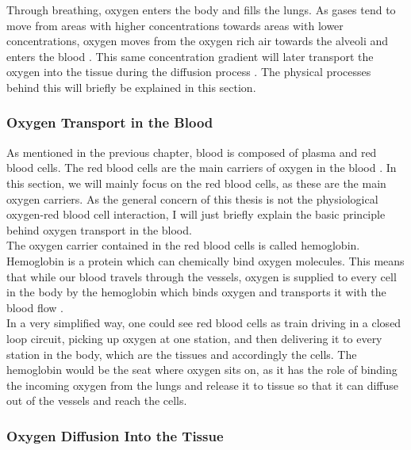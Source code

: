 Through breathing, oxygen enters the body and fills the lungs. As gases tend to move from areas with higher concentrations towards areas with lower concentrations, oxygen moves from the oxygen rich air towards the alveoli and enters the blood \cite{bukwirwa}. This same concentration gradient will later transport the oxygen into the tissue during the diffusion process \cite{pittman2011regulation}. The physical processes behind this will briefly be explained in this section.

\subsubsection*{Oxygen Transport in the Blood}

As mentioned in the previous chapter, blood is composed of plasma and red blood cells. The red blood cells are the main carriers of oxygen in the blood \cite{pittman2011regulation}. In this section, we will mainly focus on the red blood cells, as these are the main oxygen carriers. As the general concern of this thesis is not the physiological oxygen-red blood cell interaction, I will just briefly explain the basic principle behind oxygen transport in the blood.
\\The oxygen carrier contained in the red blood cells is called hemoglobin. Hemoglobin is a protein which can chemically bind oxygen molecules. This means that while our blood travels through the vessels, oxygen is supplied to every cell in the body by the hemoglobin which binds oxygen and transports it with the blood flow \cite{hellums1977resistance}.
\\In a very simplified way, one could see red blood cells as train driving in a closed loop circuit, picking up oxygen at one station, and then delivering it to every station in the body, which are the tissues and accordingly the cells. The hemoglobin would be the seat where oxygen sits on, as it has the role of binding the incoming oxygen from the lungs and release it to tissue so that it can diffuse out of the vessels and reach the cells.

\subsubsection*{Oxygen Diffusion Into the Tissue}

